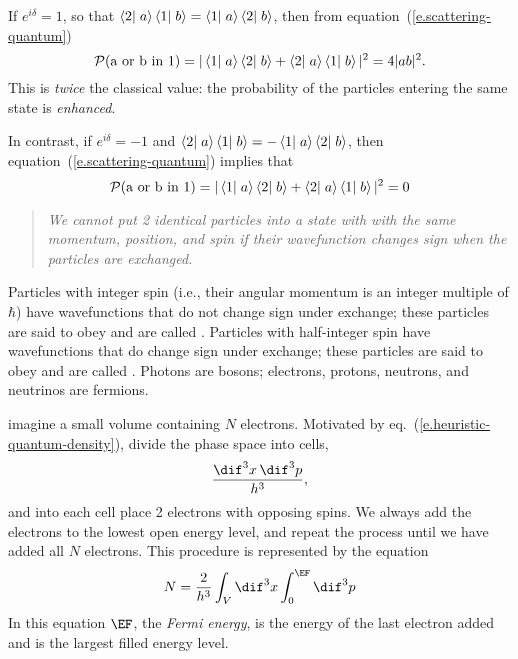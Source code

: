 \begin{sidebar}
If $e^{i\delta} = 1$, so that $\left\langle2\right|\left.a\right\rangle\left\langle1\right|\left.b\right\rangle = \left\langle1\right|\left.a\right\rangle\left\langle2\right|\left.b\right\rangle$, then from equation~(\ref{e.scattering-quantum})
\begin{equation}\label{e.boson}
    \mathcal{P}(\textrm{a or b in 1}) = |\left\langle1\right|\left.a\right\rangle\left\langle2\right|\left.b\right\rangle + \left\langle2\right|\left.a\right\rangle\left\langle1\right|\left.b\right\rangle|^2 = 4|ab|^{2}.
\end{equation}
This is \emph{twice} the classical value: the probability of the particles entering the same state is \emph{enhanced}.

In contrast, if $e^{i\delta}=-1$ and $\left\langle2\right|\left.a\right\rangle\left\langle1\right|\left.b\right\rangle = -\left\langle1\right|\left.a\right\rangle\left\langle2\right|\left.b\right\rangle$, then equation~(\ref{e.scattering-quantum}) implies that
\begin{equation}
\mathcal{P}(\textrm{a or b in 1}) = |\left\langle1\right|\left.a\right\rangle\left\langle2\right|\left.b\right\rangle + \left\langle2\right|\left.a\right\rangle\left\langle1\right|\left.b\right\rangle|^{2}     = 0\label{e.fermion}
\end{equation}
\begin{quote}\itshape
We cannot put 2 identical particles into a state with with the same momentum, position, and spin if their wavefunction changes sign when the particles are exchanged.
\end{quote}
Particles with integer spin (i.e., their angular momentum is an integer multiple of $\hbar$) have wavefunctions that do not change sign under exchange; these particles are said to obey  and are called .  Particles with half-integer spin have wavefunctions that do change sign under exchange; these particles are said to obey  and are called .  Photons are bosons; electrons, protons, neutrons, and neutrinos are fermions.
\end{sidebar}

 imagine a small volume containing $N$ electrons. Motivated by eq.~(\ref{e.heuristic-quantum-density}), divide the phase space into cells,
\[
	\frac{\dif^{3}x\,\dif^{3}p}{h^{3}},
\]
and into each cell place 2 electrons with opposing spins. We always add the electrons to the lowest open energy level, and repeat the process until we have added all $N$ electrons. This procedure is represented by the equation
\begin{equation}
\label{e.number-degenerate}
	N = \frac{2}{h^{3}}\int_{V}\dif^{3}x\int_{0}^{\EF}\dif^{3}p
\end{equation}
In this equation $\EF$, the \emph{Fermi energy}, is the energy of the last electron added and is the largest filled energy level.


